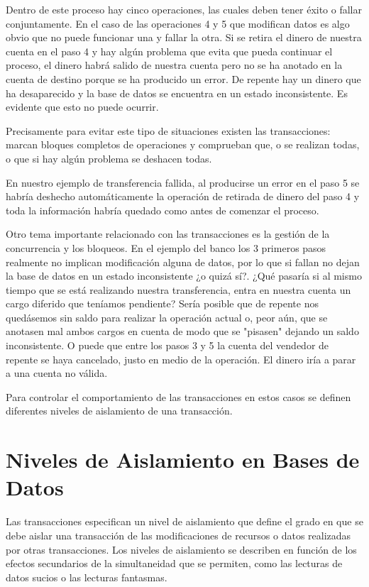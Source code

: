 \documentclass[spanish]{article}
\begin{document}
Dentro de este proceso hay cinco operaciones, las cuales deben tener éxito o fallar conjuntamente.
En el caso de las operaciones 4 y 5 que modifican datos es algo obvio que no puede funcionar una y fallar la otra. Si se retira el dinero de nuestra cuenta en el paso 4 y hay algún problema que evita que pueda continuar el proceso, el dinero habrá salido de nuestra cuenta pero no se ha anotado en la cuenta de destino porque se ha producido un error. De repente hay un dinero que ha desaparecido y la base de datos se encuentra en un estado inconsistente. Es evidente que esto no puede ocurrir.

Precisamente para evitar este tipo de situaciones existen las transacciones: marcan bloques completos de operaciones y comprueban que, o se realizan todas, o que si hay algún problema se deshacen todas.

En nuestro ejemplo de transferencia fallida, al producirse un error en el paso 5 se habría deshecho automáticamente la operación de retirada de dinero del paso 4 y toda la información habría quedado como antes de comenzar el proceso.
    

Otro tema importante relacionado con las transacciones es la gestión de la concurrencia y los bloqueos. En el ejemplo del banco los 3 primeros pasos realmente no implican modificación alguna de datos, por lo que si fallan no dejan la base de datos en un estado inconsistente ¿o quizá sí?. ¿Qué pasaría si al mismo tiempo que se está realizando nuestra transferencia, entra en nuestra cuenta un cargo diferido que teníamos pendiente? Sería posible que de repente nos quedásemos sin saldo para realizar la operación actual o, peor aún, que se anotasen mal ambos cargos en cuenta de modo que se "pisasen" dejando un saldo inconsistente. O puede que entre los pasos 3 y 5 la cuenta del vendedor de repente se haya cancelado, justo en medio de la operación. El dinero iría a parar a una cuenta no válida.

Para controlar el comportamiento de las transacciones en estos casos se definen diferentes niveles de aislamiento de una transacción.

\section{Niveles de Aislamiento en Bases de Datos}


Las transacciones especifican un nivel de aislamiento que define el grado en que se debe aislar una transacción de las modificaciones de recursos o datos realizadas por otras transacciones. Los niveles de aislamiento se describen en función de los efectos secundarios de la simultaneidad que se permiten, como las lecturas de datos sucios o las lecturas fantasmas.
\end{document}
